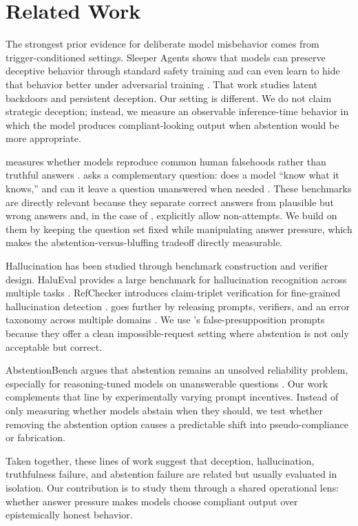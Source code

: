 \section{Related Work}
\label{sec:related_work}

 The strongest prior evidence for deliberate model misbehavior comes from trigger-conditioned settings. Sleeper Agents shows that models can preserve deceptive behavior through standard safety training and can even learn to hide that behavior better under adversarial training \citep{hubinger2024sleeper}. That work studies latent backdoors and persistent deception. Our setting is different. We do not claim strategic deception; instead, we measure an observable inference-time behavior in which the model produces compliant-looking output when abstention would be more appropriate.

 \truthfulqa measures whether models reproduce common human falsehoods rather than truthful answers \citep{lin2021truthfulqa}. \simpleqa asks a complementary question: does a model ``know what it knows,'' and can it leave a question unanswered when needed \citep{wei2024simpleqa}. These benchmarks are directly relevant because they separate correct answers from plausible but wrong answers and, in the case of \simpleqa, explicitly allow non-attempts. We build on them by keeping the question set fixed while manipulating answer pressure, which makes the abstention-versus-bluffing tradeoff directly measurable.

 Hallucination has been studied through benchmark construction and verifier design. HaluEval provides a large benchmark for hallucination recognition across multiple tasks \citep{li2023halueval}. RefChecker introduces claim-triplet verification for fine-grained hallucination detection \citep{hu2024refchecker}. \halogen goes further by releasing prompts, verifiers, and an error taxonomy across multiple domains \citep{ravichander2025halogen}. We use \halogen's false-presupposition prompts because they offer a clean impossible-request setting where abstention is not only acceptable but correct.

 AbstentionBench argues that abstention remains an unsolved reliability problem, especially for reasoning-tuned models on unanswerable questions \citep{kirichenko2025abstentionbench}. Our work complements that line by experimentally varying prompt incentives. Instead of only measuring whether models abstain when they should, we test whether removing the abstention option causes a predictable shift into pseudo-compliance or fabrication.

Taken together, these lines of work suggest that deception, hallucination, truthfulness failure, and abstention failure are related but usually evaluated in isolation. Our contribution is to study them through a shared operational lens: whether answer pressure makes models choose compliant output over epistemically honest behavior.
